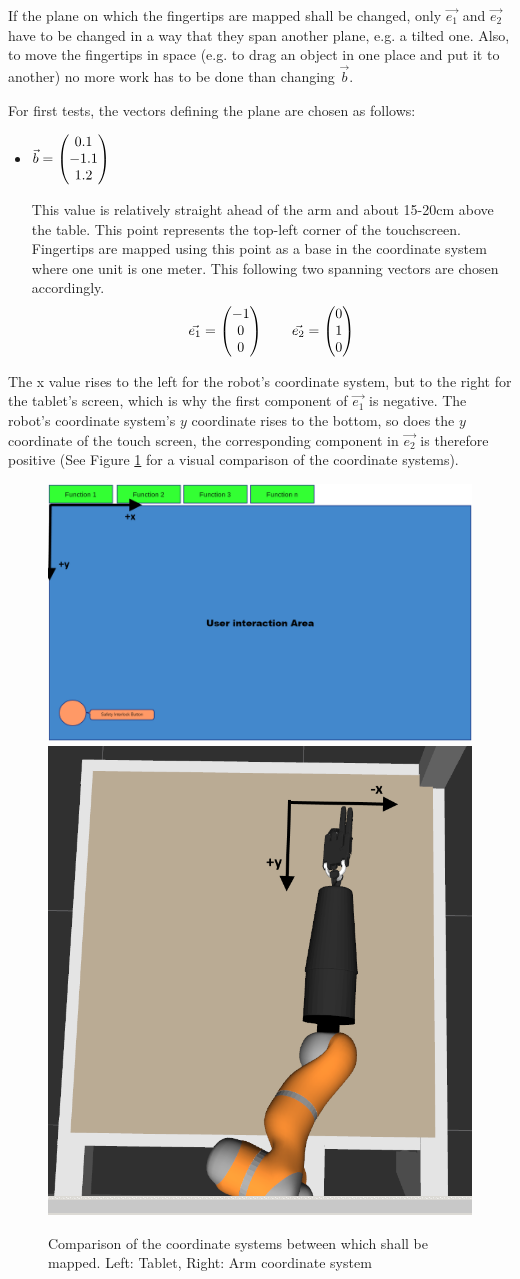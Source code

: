 If the plane on which the fingertips are mapped shall be changed, only $\vec{e_1}$ and $\vec{e_2}$ have to be changed in a way that they span another plane, e.g. a tilted one.  Also, to move the fingertips in space (e.g. to drag an object in one place and put it to another) no more work has to be done than changing $\vec{b}$. 

For first tests, the vectors defining the plane are chosen as follows:
\begin{itemize}
	\item $\vec{b} = \left( \begin{matrix} 0.1 \\ -1.1 \\ 1.2 \end{matrix} \right)$
	
	This value is relatively straight ahead of the arm and about 15-20cm above the table. This point represents the top-left corner of the touchscreen. Fingertips are mapped using this point as a base in the coordinate system where one unit is one meter. This following two spanning vectors are chosen accordingly.
	\begin{equation*}
	 \vec{e_1} = \left( \begin{matrix} -1 \\ 0 \\ 0 \end{matrix} \right) \qquad
	\vec{e_2} = \left( \begin{matrix} 0 \\ 1 \\ 0 \end{matrix} \right)
	\end{equation*}
	
\end{itemize}

The x value rises to the left for the robot's coordinate system, but to the right for the tablet's screen, which is why the first component of $\vec{e_1}$ is negative. The robot's coordinate system's $y$ coordinate rises to the bottom, so does the $y$ coordinate of the touch screen, the corresponding component in $\vec{e_2}$ is therefore positive (See Figure \ref{fig:dfmt:coords} for a visual comparison of the coordinate systems).

\begin{figure}
	\caption{\label{fig:dfmt:coords}Comparison of the coordinate systems between which shall be mapped. Left: Tablet, Right: Arm coordinate system}
	\includegraphics[width=0.6\linewidth]{assets/chpt_concepts/dfmt_coord_screen.png}
	\includegraphics[width=0.4\linewidth]{assets/chpt_concepts/dfmt_coord_arm.png}
\end{figure}

